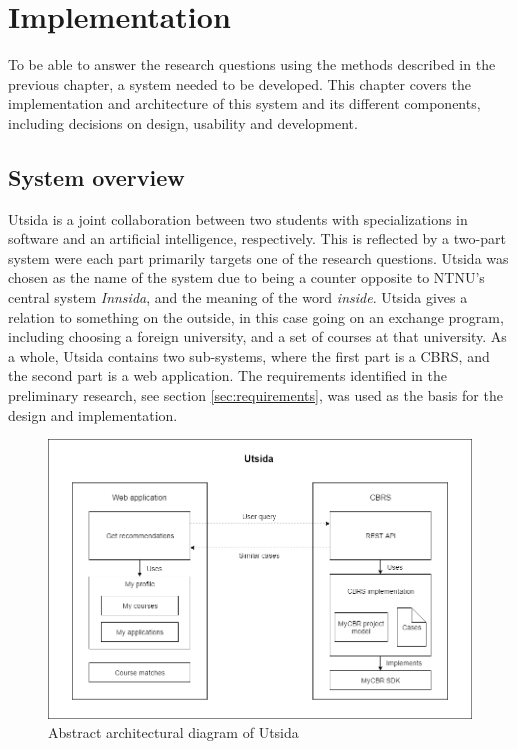 
\chapter{Implementation}
To be able to answer the research questions using the methods described in the previous chapter, a system needed to be developed. This chapter covers the implementation and architecture of this system and its different components, including decisions on design, usability and development.

\section{System overview}

Utsida is a joint collaboration between two students with specializations in software and an artificial intelligence, respectively. This is reflected by a two-part system were each part primarily targets one of the research questions. Utsida was chosen as the name of the system due to being a counter opposite to NTNU's central system \emph{Innsida}, and the meaning of the word \emph{inside}. Utsida gives a relation to something on the outside, in this case going on an exchange program, including choosing a foreign university, and a set of courses at that university. As a whole, Utsida contains two sub-systems, where the first part is a CBRS, and the second part is a web application. The requirements identified in the preliminary research, see section \ref{sec:requirements}, was used as the basis for the design and implementation.

\begin{figure}[H]
    \centering
    \includegraphics[width=1\textwidth]{fig/system_overview.png}
    \caption{Abstract architectural diagram of Utsida}
    \label{fig:system_overview}
\end{figure}



